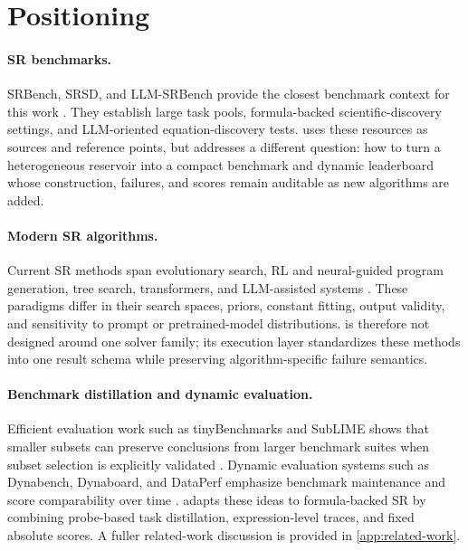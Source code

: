 \section{Positioning}

\paragraph{SR benchmarks.}
SRBench, SRSD, and LLM-SRBench provide the closest benchmark context for this work \citep{lacava2021contemporary,matsubara2024rethinking,shojaee2025llmsrbench}. They establish large task pools, formula-backed scientific-discovery settings, and LLM-oriented equation-discovery tests. \arena{} uses these resources as sources and reference points, but addresses a different question: how to turn a heterogeneous reservoir into a compact benchmark and dynamic leaderboard whose construction, failures, and scores remain auditable as new algorithms are added.

\paragraph{Modern SR algorithms.}
Current SR methods span evolutionary search, RL and neural-guided program generation, tree search, transformers, and LLM-assisted systems \citep{cranmer2023pysr,petersen2021dsr,landajuela2022unified,shojaee2023tpsr,shojaee2025llmsr}. These paradigms differ in their search spaces, priors, constant fitting, output validity, and sensitivity to prompt or pretrained-model distributions. \arena{} is therefore not designed around one solver family; its execution layer standardizes these methods into one result schema while preserving algorithm-specific failure semantics.

\paragraph{Benchmark distillation and dynamic evaluation.}
Efficient evaluation work such as tinyBenchmarks and SubLIME shows that smaller subsets can preserve conclusions from larger benchmark suites when subset selection is explicitly validated \citep{polo2024tinybenchmarks,saranathan2025sublime}. Dynamic evaluation systems such as Dynabench, Dynaboard, and DataPerf emphasize benchmark maintenance and score comparability over time \citep{kiela2021dynabench,ma2021dynaboard,mazumder2023dataperf}. \arena{} adapts these ideas to formula-backed SR by combining probe-based task distillation, expression-level traces, and fixed absolute scores. A fuller related-work discussion is provided in \cref{app:related-work}.
